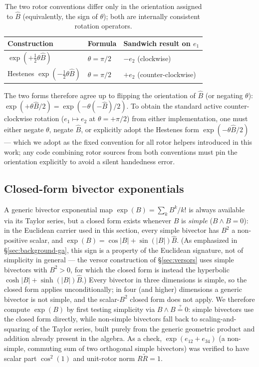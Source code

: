\documentclass[11pt]{article}
\begin{document}
\begin{table}[h]
\centering
\begin{tabular}{@{}lll@{}}
\toprule
Construction & Formula & Sandwich result on $e_1$ \\
\midrule
$\exp(+\tfrac{1}{2}\theta\hat B)$ & $\theta=\pi/2$ & $-e_2$ (clockwise) \\
Hestenes $\exp(-\tfrac{1}{2}\theta\hat B)$ & $\theta=\pi/2$ & $+e_2$ (counter-clockwise) \\
\bottomrule
\end{tabular}
\caption{The two rotor conventions differ only in the orientation assigned to $\hat B$ (equivalently, the sign of $\theta$); both are internally consistent rotation operators.}
\label{tab:rotor}
\end{table}

The two forms therefore agree up to flipping the orientation of $\hat B$ (or negating $\theta$): $\exp(+\theta\hat B/2)=\exp(-\theta(-\hat B)/2)$. To obtain the standard active counter-clockwise rotation ($e_1\mapsto e_2$ at $\theta=+\pi/2$) from either implementation, one must either negate $\theta$, negate $\hat B$, or explicitly adopt the Hestenes form $\exp(-\theta\hat B/2)$ — which we adopt as the fixed convention for all rotor helpers introduced in this work; any code combining rotor sources from both conventions must pin the orientation explicitly to avoid a silent handedness error.

\subsection{Closed-form bivector exponentials}
\label{sec:bivector-exp}

A generic bivector exponential map $\exp(B)=\sum_k B^k/k!$ is always available via its Taylor series, but a closed form exists whenever $B$ is \emph{simple} ($B\wedge B = 0$): in the Euclidean carrier used in this section, every simple bivector has $B^2$ a non-positive scalar, and $\exp(B) = \cos|B| + \sin(|B|)\hat B$. (As emphasized in \S\ref{sec:background-ga}, this sign is a property of the Euclidean signature, not of simplicity in general — the versor construction of \S\ref{sec:versors} uses simple bivectors with $B^2>0$, for which the closed form is instead the hyperbolic $\cosh|B|+\sinh(|B|)\hat B$.) Every bivector in three dimensions is simple, so the closed form applies unconditionally; in four (and higher) dimensions a generic bivector is not simple, and the scalar-$B^2$ closed form does not apply. We therefore compute $\exp(B)$ by first testing simplicity via $B\wedge B \overset{?}{=} 0$: simple bivectors use the closed form directly, while non-simple bivectors fall back to scaling-and-squaring of the Taylor series, built purely from the generic geometric product and addition already present in the algebra. As a check, $\exp(e_{12}+e_{34})$ (a non-simple, commuting sum of two orthogonal simple bivectors) was verified to have scalar part $\cos^2(1)$ and unit-rotor norm $R\tilde R = 1$.
\end{document}
